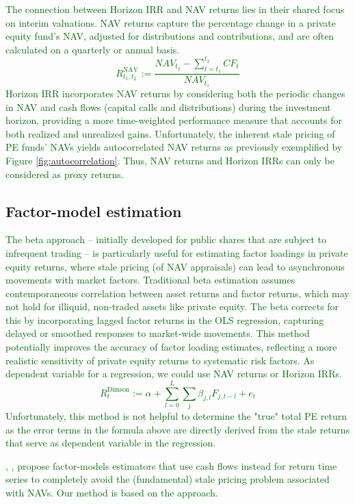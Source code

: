 \textcolor{darkgreen}{
	The connection between Horizon IRR and NAV returns lies in their shared focus on interim valuations. 
	NAV returns capture the percentage change in a private equity fund's NAV, adjusted for distributions and contributions, and are often calculated on a quarterly or annual basis. 
	\[
	R_{t_1, t_2}^{\mathrm{NAV}} := \frac{{NAV}_{t_2} - \sum_{t=t_1}^{t_2} {CF}_t }{{NAV}_{t_1}}
	\]
	Horizon IRR incorporates NAV returns by considering both the periodic changes in NAV and cash flows (capital calls and distributions) during the investment horizon, providing a more time-weighted performance measure that accounts for both realized and unrealized gains. 
	Unfortunately, the inherent stale pricing of PE funds' NAVs yields autocorrelated NAV returns as previously exemplified by Figure \ref{fig:autocorrelation}.
	Thus, NAV returns and Horizon IRRs can only be considered as proxy returns.
	}
	
\subsection{Factor-model estimation}

\textcolor{darkgreen}{
	The \cite{dimson1979risk} beta approach -- initially developed for public shares that are subject to infrequent trading -- is particularly useful for estimating factor loadings in private equity returns, where stale pricing (of NAV appraisals) can lead to asynchronous movements with market factors. 
	Traditional beta estimation assumes contemporaneous correlation between asset returns and factor returns, which may not hold for illiquid, non-traded assets like private equity. 
	The \cite{dimson1979risk} beta corrects for this by incorporating lagged factor returns in the OLS regression, capturing delayed or smoothed responses to market-wide movements. 
	This method potentially improves the accuracy of factor loading estimates, reflecting a more realistic sensitivity of private equity returns to systematic risk factors.
	As dependent variable for a \cite{dimson1979risk} regression, we could use NAV returns or Horizon IRRs.
	\[
	R_t^{\mathrm{Dimson}} := 
	\alpha + \sum_{l=0}^L \sum_j \beta_{j,l} F_{j,t-l} + e_{t}
	\]
	Unfortunately, this method is not helpful to determine the "true" total PE return as the error terms in the formula above are directly derived from the stale returns that serve as dependent variable in the regression. 
}

\textcolor{darkgreen}{
	\cite{DLP12}, \cite{KN16}, \cite{ACGP18} propose factor-models estimators that use cash flows instead for return time series to completely avoid the (fundamental) stale pricing problem associated with NAVs.
	Our method is based on the \cite{DLP12} approach.
}

